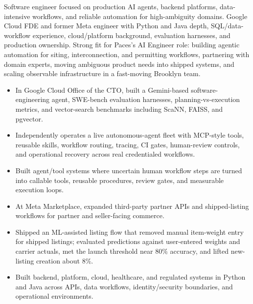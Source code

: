 


Software engineer focused on production AI agents, backend platforms, data-intensive workflows, and reliable automation for high-ambiguity domains. Google Cloud FDE and former Meta engineer with Python and Java depth, SQL/data-workflow experience, cloud/platform background, evaluation harnesses, and production ownership. Strong fit for Paces's AI Engineer role: building agentic automation for siting, interconnection, and permitting workflows, partnering with domain experts, moving ambiguous product needs into shipped systems, and scaling observable infrastructure in a fast-moving Brooklyn team.
\begin{itemize}
  \item In Google Cloud Office of the CTO, built a Gemini-based software-engineering agent, SWE-bench evaluation harnesses, planning-vs-execution metrics, and vector-search benchmarks including ScaNN, FAISS, and pgvector.
  \item Independently operates a live autonomous-agent fleet with MCP-style tools, reusable skills, workflow routing, tracing, CI gates, human-review controls, and operational recovery across real credentialed workflows.
  \item Built agent/tool systems where uncertain human workflow steps are turned into callable tools, reusable procedures, review gates, and measurable execution loops.
\end{itemize}
\begin{itemize}
  \item At Meta Marketplace, expanded third-party partner APIs and shipped-listing workflows for partner and seller-facing commerce.
  \item Shipped an ML-assisted listing flow that removed manual item-weight entry for shipped listings; evaluated predictions against user-entered weights and carrier actuals, met the launch threshold near 80\% accuracy, and lifted new-listing creation about 8\%.
  \item Built backend, platform, cloud, healthcare, and regulated systems in Python and Java across APIs, data workflows, identity/security boundaries, and operational environments.
\end{itemize}




